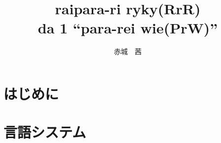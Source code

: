 \documentclass[a4paper, 12pt, titlepage]{ltjsarticle}
\title{raipara-ri ryky(RrR) \\ \small da 1 ``para-rei wie(PrW)''}
\author{赤城　茜}
\begin{document}
\maketitle

\tableofcontents \clearpage

\part{はじめに}

 \clearpage

\part{言語システム}

 \clearpage
 \clearpage
 \clearpage
\end{document}
